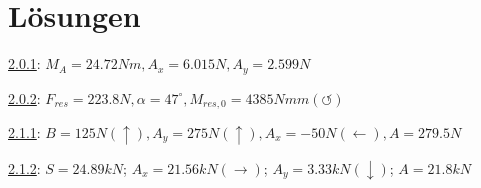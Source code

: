 \chapter{Lösungen}\label{app:B_Lösungen}

\underline{2.0.1}:
$M_A = 24.72Nm, A_x = 6.015N, A_y = 2.599N$

\underline{2.0.2}:
$F_{res} = 223.8N, \alpha = 47^{\circ}, M_{res, 0} = 4385Nmm (\circlearrowleft)$

\underline{2.1.1}:
$B = 125N (\uparrow), A_y = 275N (\uparrow), A_x = -50N (\leftarrow), A = 279.5N$

\underline{2.1.2}: $S = 24.89kN$; $A_x = 21.56kN (\rightarrow)$;
$A_y = 3.33kN(\downarrow)$; $A = 21.8kN$